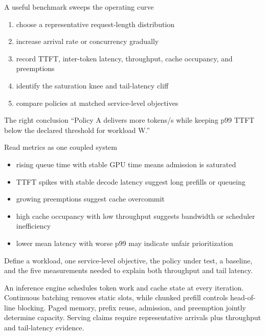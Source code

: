 \documentclass[handout]{beamer}
\begin{document}
\begin{frame}{A useful benchmark sweeps the operating curve}
  \begin{enumerate}
    \setlength{\itemsep}{7pt}
    \item choose a representative request-length distribution
    \item increase arrival rate or concurrency gradually
    \item record TTFT, inter-token latency, throughput, cache occupancy, and preemptions
    \item identify the saturation knee and tail-latency cliff
    \item compare policies at matched service-level objectives
  \end{enumerate}
  \begin{block}{The right conclusion}
    ``Policy A delivers more tokens/s while keeping p99 TTFT below the declared threshold for workload W.''
  \end{block}
\end{frame}

\begin{frame}{Read metrics as one coupled system}
  \begin{itemize}
    \setlength{\itemsep}{7pt}
    \item rising queue time with stable GPU time means admission is saturated
    \item TTFT spikes with stable decode latency suggest long prefills or queueing
    \item growing preemptions suggest cache overcommit
    \item high cache occupancy with low throughput suggests bandwidth or scheduler inefficiency
    \item lower mean latency with worse p99 may indicate unfair prioritization
  \end{itemize}
\end{frame}

  {Define a workload, one service-level objective, the policy under test, a baseline, and the five measurements needed to explain both throughput and tail latency.}

\takeaways
  {An inference engine schedules token work and cache state at every iteration.}
  {Continuous batching removes static slots, while chunked prefill controls head-of-line blocking.}
  {Paged memory, prefix reuse, admission, and preemption jointly determine capacity.}
  {Serving claims require representative arrivals plus throughput and tail-latency evidence.}
\end{document}
